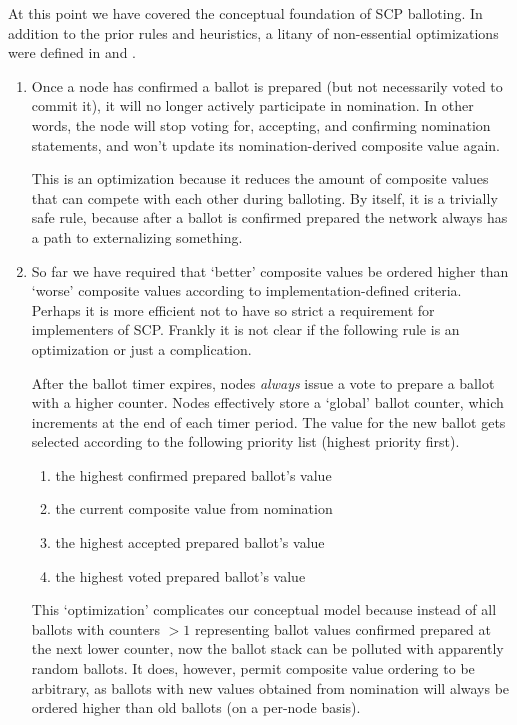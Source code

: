 At this point we have covered the conceptual foundation of SCP balloting. In addition to the prior rules and heuristics, a litany of non-essential optimizations were defined in \cite{stellar-consensus-protocol} and \cite{scp-ietf-draft}.

\begin{enumerate}
    \item Once a node has confirmed a ballot is prepared (but not necessarily voted to commit it), it will no longer actively participate in nomination. In other words, the node will stop voting for, accepting, and confirming nomination statements, and won't update its nomination-derived composite value again.

    This is an optimization because it reduces the amount of composite values that can compete with each other during balloting. By itself, it is a trivially safe rule, because after a ballot is confirmed prepared the network always has a path to externalizing something.

    \item So far we have required that `better' composite values be ordered higher than `worse' composite values according to implementation-defined criteria. Perhaps it is more efficient not to have so strict a requirement for implementers of SCP. Frankly it is not clear if the following rule is an optimization or just a complication.

    After the ballot timer expires, nodes {\em always} issue a vote to prepare a ballot with a higher counter. Nodes effectively store a `global' ballot counter, which increments at the end of each timer period. The value for the new ballot gets selected according to the following priority list (highest priority first).
    \begin{enumerate}
        \item the highest confirmed prepared ballot's value
        \item the current composite value from nomination
        \item the highest accepted prepared ballot's value
        \item the highest voted prepared ballot's value
    \end{enumerate}

    This `optimization' complicates our conceptual model because instead of all ballots with counters $> 1$ representing ballot values confirmed prepared at the next lower counter, now the ballot stack can be polluted with apparently random ballots. It does, however, permit composite value ordering to be arbitrary, as ballots with new values obtained from nomination will always be ordered higher than old ballots (on a per-node basis).


\end{enumerate}
